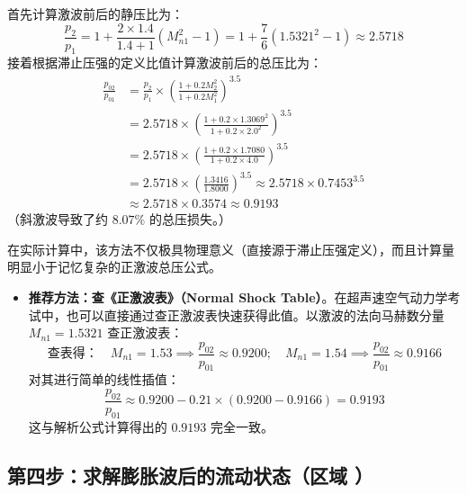 \documentclass[a4paper,11pt]{article}
\begin{document}
首先计算激波前后的静压比为：
\begin{equation}
    \frac{p_2}{p_1} = 1 + \frac{2 \times 1.4}{1.4 + 1} (M_{n1}^2 - 1) = 1 + \frac{7}{6} (1.5321^2 - 1) \approx 2.5718
\end{equation}
接着根据滞止压强的定义比值计算激波前后的总压比为：
\begin{align}
    \frac{p_{02}}{p_{01}} &= \frac{p_2}{p_1} \times \left( \frac{1 + 0.2 M_2^2}{1 + 0.2 M_1^2} \right)^{3.5} \nonumber \\
    &= 2.5718 \times \left( \frac{1 + 0.2 \times 1.3069^2}{1 + 0.2 \times 2.0^2} \right)^{3.5} \nonumber \\
    &= 2.5718 \times \left( \frac{1 + 0.2 \times 1.7080}{1 + 0.2 \times 4.0} \right)^{3.5} \nonumber \\
    &= 2.5718 \times \left( \frac{1.3416}{1.8000} \right)^{3.5} \approx 2.5718 \times 0.7453^{3.5} \nonumber \\
    &\approx 2.5718 \times 0.3574 \approx 0.9193
\end{align}
（斜激波导致了约 $8.07\%$ 的总压损失。）

\begin{tcolorbox}[colback=yellow!5,colframe=orange,title=学习与考场提示：如何快速获取此总压比值？]
在实际计算中，该方法不仅极具物理意义（直接源于滞止压强定义），而且计算量明显小于记忆复杂的正激波总压公式。
\begin{itemize}
    \item \textbf{推荐方法：查《正激波表》（Normal Shock Table）}。在超声速空气动力学考试中，也可以直接通过查正激波表快速获得此值。以激波的法向马赫数分量 $M_{n1} = 1.5321$ 查正激波表：
    \[
    \text{查表得：} \quad M_{n1} = 1.53 \implies \frac{p_{02}}{p_{01}} \approx 0.9200; \quad M_{n1} = 1.54 \implies \frac{p_{02}}{p_{01}} \approx 0.9166
    \]
    对其进行简单的线性插值：
    \[
    \frac{p_{02}}{p_{01}} \approx 0.9200 - 0.21 \times (0.9200 - 0.9166) = 0.9193
    \]
    这与解析公式计算得出的 $0.9193$ 完全一致。
\end{itemize}
\end{tcolorbox}

\subsection{第四步：求解膨胀波后的流动状态（区域 \uppercase\expandafter{}）}
\end{document}
